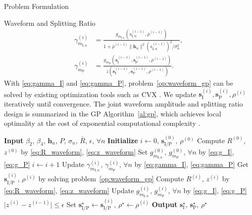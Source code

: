 \documentclass[journal]{IEEEtran}
\begin{document}
\begin{section}{Problem Formulation}
\begin{subsection}{Waveform and Splitting Ratio}
			\begin{align}
				\gamma_{m_{\mathrm{I},n}}^{(i)} & = \frac{g_{m_{\mathrm{I},n}}(s_{\mathrm{I},n}^{(i-1)},\bar{\rho}^{(i-1)})}{1+{\bar{\rho}^{(i-1)}\lVert{\boldsymbol{h}_n}\rVert^2 (s_{\mathrm{I},n}^{(i-1)})^2}\big/{\sigma_n^2}}\label{eq:gamma_I},\\
				\gamma_{m_\mathrm{P}}^{(i)} & = \frac{g_{m_\mathrm{P}}(\boldsymbol{s}_{\mathrm{I}}^{(i-1)},\boldsymbol{s}_\mathrm{P}^{(i-1)},\rho^{(i-1)})}{z(\boldsymbol{s}_{\mathrm{I}}^{(i-1)},\boldsymbol{s}_\mathrm{P}^{(i-1)},\rho^{(i-1)})}\label{eq:gamma_P}.
			\end{align}
			With \eqref{eq:gamma_I} and \eqref{eq:gamma_P}, problem~\eqref{op:waveform_gp} can be solved by existing optimization tools such as CVX \cite{Grant2008}. We update $\boldsymbol{s}_{\mathrm{I}}^{(i)},\boldsymbol{s}_\mathrm{P}^{(i)},\rho^{(i)}$ iteratively until convergence. The joint waveform amplitude and splitting ratio design is summarized in the GP Algorithm~\ref{al:gp}, which achieves local optimality at the cost of exponential computational complexity \cite{Chiang2005}.

			\begin{algorithm}[!t]
				\caption{GP: Waveform Amplitude and Splitting Ratio.}
				\label{al:gp}
				\begin{algorithmic}[1]
					\State \textbf{Input} $\beta_2$, $\beta_4$, $\boldsymbol{h}_n$, $P$, $\sigma_n$, $\bar{R}$, $\epsilon$, $\forall n$
					\State \textbf{Initialize} $i \gets 0$, $\boldsymbol{s}_{\mathrm{I/P}}^{(0)}$, $\rho^{(0)}$
					\State Compute $R^{(0)}$, $z^{(0)}$ by \eqref{eq:R_waveform}, \eqref{eq:z_waveform}
					\State Set $g_{m_{\mathrm{I},n}}^{(0)}$, $g_{m_\mathrm{P}}^{(0)}$, $\forall n$ by \eqref{eq:g_I}, \eqref{eq:g_P}
					\Repeat
						\State $i \gets i + 1$
						\State Update $\gamma_{m_{\mathrm{I},n}}^{(i)}$, $\gamma_{m_\mathrm{P}}^{(i)}$, $\forall n$ by \eqref{eq:gamma_I}, \eqref{eq:gamma_P}
						\State Get $\boldsymbol{s}_{\mathrm{I/P}}^{(i)}$, $\rho^{(i)}$ by solving problem~\eqref{op:waveform_gp}
						\State Compute $R^{(i)}$, $z^{(i)}$ by \eqref{eq:R_waveform}, \eqref{eq:z_waveform}
						\State Update $g_{m_{\mathrm{I},n}}^{(i)}$, $g_{m_\mathrm{P}}^{(i)}$, $\forall n$ by \eqref{eq:g_I}, \eqref{eq:g_P}
					\Until $\lvert z^{(i)} - z^{(i-1)} \rvert \le \epsilon$
					\State Set $\boldsymbol{s}_{\mathrm{I/P}}^{\star} \gets \boldsymbol{s}_{\mathrm{I/P}}^{(i)}$, $\rho^{\star} \gets \rho^{(i)}$
					\State \textbf{Output} $\boldsymbol{s}_{\mathrm{I}}^{\star}$, $\boldsymbol{s}_{\mathrm{P}}^{\star}$, $\rho^{\star}$
				\end{algorithmic}
			\end{algorithm}


\end{subsection}
\end{section}
\end{document}
